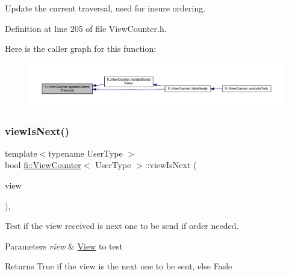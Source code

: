 Update the current traversal, used for insure ordering. 



Definition at line 205 of file View\+Counter.\+h.

Here is the caller graph for this function\+:
\nopagebreak
\begin{figure}[H]
\begin{center}
\leavevmode
\includegraphics[width=350pt]{df/dae/classfi_1_1ViewCounter_a8a1bd60b42035140d6abee7e58fc3561_icgraph}
\end{center}
\end{figure}
\mbox{\label{classfi_1_1ViewCounter_a30a0d5ae3d727aea55e70ee4eb45127f}} 
\subsubsection{\texorpdfstring{view\+Is\+Next()}{viewIsNext()}}
{\footnotesize\ttfamily template$<$typename User\+Type $>$ \\
bool \hyperlink{classfi_1_1ViewCounter}{fi\+::\+View\+Counter}$<$ User\+Type $>$\+::view\+Is\+Next (\begin{DoxyParamCaption}\item[{htgs\+::m\+\_\+data\+\_\+t$<$ \hyperlink{classfi_1_1View}{fi\+::\+View}$<$ User\+Type $>$$>$}]{view }\end{DoxyParamCaption})\hspace{0.3cm}{\ttfamily [inline]}, {\ttfamily [private]}}



Test if the view received is next one to be send if order needed. 


\begin{DoxyParams}{Parameters}
{\em view} & \hyperlink{classfi_1_1View}{View} to test \\
\hline
\end{DoxyParams}
\begin{DoxyReturn}{Returns}
True if the view is the next one to be sent, else Fasle 
\end{DoxyReturn}


